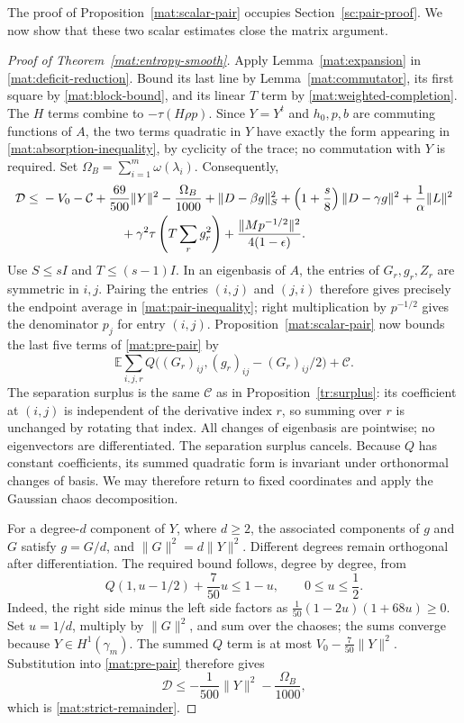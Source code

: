 \documentclass[11pt]{article}
\newcommand{\mathscr}[1]{\mathcal{#1}}
\newcommand{\E}{\mathbb E}
\newcommand{\Id}{I}
\theoremstyle{definition}
\theoremstyle{remark}
\numberwithin{equation}{section}
\begin{document}
The proof of Proposition~\ref{mat:scalar-pair} occupies
Section~\ref{sc:pair-proof}.  We now show that these two scalar estimates
close the matrix argument.

\begin{proof}[Proof of Theorem~\ref{mat:entropy-smooth}]
Apply Lemma~\ref{mat:expansion} in
\eqref{mat:deficit-reduction}.  Bound its last line by
Lemma~\ref{mat:commutator}, its first square by
\eqref{mat:block-bound}, and its linear $T$ term by
\eqref{mat:weighted-completion}.  The $H$ terms combine to
$-\tau(H\rho p)$.  Since $Y=Y^t$ and $h_0,p,b$ are commuting functions
of $A$, the two terms quadratic in $Y$ have exactly the form appearing
in \eqref{mat:absorption-inequality}, by cyclicity of the trace;
no commutation with $Y$ is required.  Set
$\Omega_B=\sum_{i=1}^m\omega(\lambda_i)$.  Consequently,
\begin{align}
 \mathscr D\le {}&-V_0-\mathcal C+\frac{69}{500}\|Y\|^2
    -\frac{\Omega_B}{1000}
    +\|D-\beta g\|_S^2
    +\left(1+\frac s8\right)\|D-\gamma g\|^2
    +\frac1\alpha\|L\|^2\nonumber\\
 &\hspace{22mm}+\gamma^2\tau\left(T\sum_rg_r^2\right)
    +\frac{\|Mp^{-1/2}\|^2}{4(1-\epsilon)}.
 \label{mat:pre-pair}
\end{align}
Use $S\le s\Id$ and $T\le(s-1)\Id$.  In an eigenbasis of $A$, the
entries of $G_r,g_r,Z_r$ are symmetric in $i,j$.  Pairing the entries
$(i,j)$ and $(j,i)$ therefore gives precisely the endpoint average in
\eqref{mat:pair-inequality}; right multiplication by $p^{-1/2}$ gives
the denominator $p_j$ for entry $(i,j)$.  Proposition~\ref{mat:scalar-pair}
now bounds the last five terms of \eqref{mat:pre-pair} by
\[
 \E\sum_{i,j,r}Q\bigl((G_r)_{ij},(g_r)_{ij}-(G_r)_{ij}/2\bigr)
       +\mathcal C.
\]
The separation surplus is the same $\mathcal C$ as in
Proposition~\ref{tr:surplus}: its coefficient at $(i,j)$ is independent
of the derivative index $r$, so summing over $r$ is unchanged by rotating
that index.  All changes of eigenbasis are pointwise; no eigenvectors are
differentiated.  The separation surplus cancels.
Because $Q$ has constant coefficients,
its summed quadratic form is invariant under orthonormal changes of
basis.  We may therefore return to fixed coordinates and apply the
Gaussian chaos decomposition.

For a degree-$d$ component of $Y$, where $d\ge2$, the associated
components of $g$ and $G$ satisfy $g=G/d$, and
$\|G\|^2=d\|Y\|^2$.  Different degrees remain orthogonal after
differentiation.  The required bound follows, degree by degree, from
\begin{equation}\label{mat:final-polynomial}
 Q(1,u-1/2)+\frac7{50}u\le1-u,
 \qquad 0\le u\le\frac12.
\end{equation}
Indeed, the right side minus the left side factors as
$\frac1{50}(1-2u)(1+68u)\ge0$.  Set $u=1/d$, multiply by
$\|G\|^2$, and sum over the chaoses; the sums converge because
$Y\in H^1(\gamma_m)$.  The summed $Q$ term is at most
$V_0-\frac7{50}\|Y\|^2$.  Substitution into
\eqref{mat:pre-pair} therefore gives
\[
 \mathscr D\le-\frac1{500}\|Y\|^2-\frac{\Omega_B}{1000},
\]
which is \eqref{mat:strict-remainder}.
\end{proof}
\end{document}
